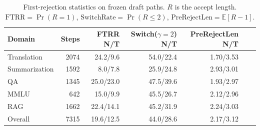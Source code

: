 \begin{table}[t]
\centering
\small
\caption{First-rejection statistics on frozen draft paths. $R$ is the accept length. $\mathrm{FTRR}=\Pr(R=1)$, $\mathrm{SwitchRate}=\Pr(R\le 2)$, $\mathrm{PreRejectLen}=\mathbb{E}[R-1]$.}
\label{tab:first_reject_survival}
\begin{tabular}{lrrrrrr}
\toprule
Domain & Steps & FTRR N/T & Switch($\gamma=2$) N/T & PreRejectLen N/T \\
\midrule
Translation & 2074 & 24.2/9.6 & 54.0/22.4 & 1.70/3.53 \\
Summarization & 1592 & 8.0/7.8 & 25.9/24.8 & 2.93/3.01 \\
QA & 1345 & 25.0/23.0 & 47.5/39.6 & 1.93/2.97 \\
MMLU & 642 & 15.0/9.9 & 45.5/26.7 & 2.12/2.96 \\
RAG & 1662 & 22.4/14.1 & 45.2/31.9 & 2.24/3.03 \\
Overall & 7315 & 19.6/12.5 & 44.0/28.6 & 2.17/3.12 \\
\bottomrule
\end{tabular}
\end{table}
